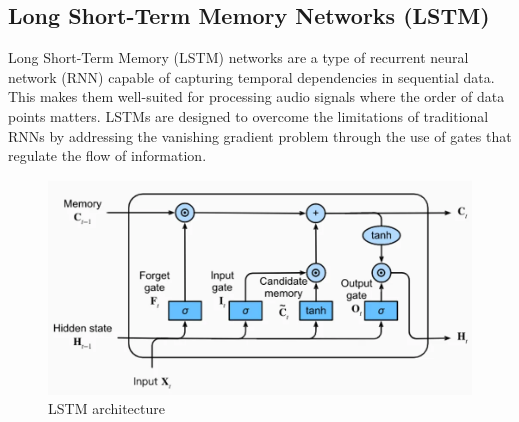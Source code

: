 \subsection{Long Short-Term Memory Networks (LSTM)}

Long Short-Term Memory (LSTM) networks are a type of recurrent neural network (RNN) capable of capturing temporal dependencies in sequential data. This makes them well-suited for processing audio signals where the order of data points matters. LSTMs are designed to overcome the limitations of traditional RNNs by addressing the vanishing gradient problem through the use of gates that regulate the flow of information.

\begin{figure}[h!]
    \centering
        \includegraphics[scale=0.4]{images/LSTM.png}
        \caption{LSTM architecture}%
    \end{figure}



